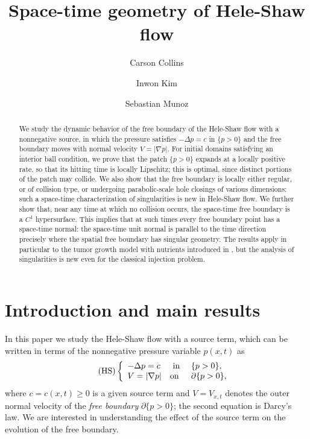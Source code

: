 \documentclass[11pt]{amsart}
\title{Space-time geometry of Hele-Shaw flow}
\author{Carson Collins}
\author{Inwon Kim}
\author{Sebastian Munoz}
\date{}
\numberwithin{equation}{section}
\numberwithin{figure}{section}
\theoremstyle{plain}
\theoremstyle{definition}
\theoremstyle{remark}
\theoremstyle{plain}
\newcommand{\abs}[1]{\lvert #1 \rvert}
\begin{document}
\begin{abstract}
We study the dynamic behavior of the free boundary of the Hele-Shaw flow with a nonnegative source, in
which the pressure satisfies $-\Delta p=c$ in $\{p>0\}$ and the free boundary moves with
normal velocity $V=\abs{\nabla p}$. For initial domains satisfying an interior ball
condition, we prove that the patch $\{p>0\}$ expands at a locally positive rate, so that its
hitting time is locally Lipschitz; this is optimal, since distinct portions of the patch may
collide. We also show that the free boundary is locally either regular, or of collision type, or undergoing parabolic-scale hole closings of various dimensions: such a space-time characterization of singularities is new in Hele-Shaw flow.
We further show that, near any
time at which no collision occurs, the space-time free boundary is a $C^1$ hypersurface. This implies that at such times every free boundary point has a space-time normal: the space-time unit normal is parallel to the time direction precisely where the spatial free boundary has singular geometry.
The results apply in particular to the tumor growth model with nutrients introduced in \cite{PQV14},
but the analysis of singularities is new even for the classical injection problem.
\end{abstract}

\maketitle
\tableofcontents

\section{Introduction and main results}\label{sec:introduction}

In this paper we study the Hele-Shaw flow with a source term, which can be written in terms of the nonnegative pressure variable $p(x,t)$ as
\begin{equation*}\tag{HS}\label{eq:intro-HS-law}
\left\{\begin{array}{lll}
    -\Delta p=c &\hbox{ in }&\{p>0\},\\
    V=|\nabla p| &\hbox{on }&\partial\{p>0\},
\end{array}\right.
\end{equation*}
where $c=c(x,t) \geq 0$ is a given source term and $V=V_{x,t}$ denotes the outer normal velocity of the {\it free boundary } $\partial\{p>0\}$; the second equation is Darcy's law. We are interested  in understanding the effect of the source term on the evolution of the free boundary. 
\end{document}
